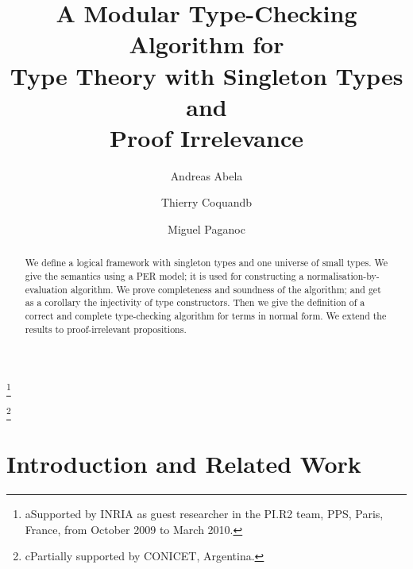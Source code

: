 \documentclass{LMCS}
\begin{document}
\title[A Modular Type-Checking Algorithm for Type Theory]{A Modular
  Type-Checking Algorithm for \\ Type Theory with Singleton Types and
  \\ Proof Irrelevance}

\author[A.~Abel]{Andreas Abel\rsuper a}	\address{{\lsuper a}Ludwig-Maximilians-Universit\"{a}t M\"{u}nchen}	\email{\abelmail}  \thanks{{\lsuper a}Supported by INRIA 
as guest researcher in the PI.R2 team, PPS,
Paris, France, from October 2009 to March 2010.}	

\author[T.~Coquand]{Thierry Coquand\rsuper b}	\address{{\lsuper b}G\"{o}teborg University}	\email{\coquandmail}  

\author[M.~Pagano]{Miguel Pagano\rsuper c} \address{{\lsuper c}Universidad Nacional de C\'{o}rdoba} \email{\paganomail} \thanks{{\lsuper c}Partially supported by CONICET, Argentina.} 











\begin{abstract}
  \noindent We define a logical framework with singleton types and one
  universe of small types. We give the semantics using a PER model; it
  is used for constructing a normalis\-ation-by-evaluation algorithm.
  We prove completeness and soundness of the algorithm; and get as a
  corollary the injectivity of type constructors. Then we give the
  definition of a correct and complete type-checking algorithm for
  terms in normal form. We extend the results to proof-irrelevant
  propositions.
\end{abstract}

\maketitle

\newtheorem{lemma}[thm]{Lemma}
\newtheorem{corollary}[thm]{Corollary}
\newtheorem{remark}[thm]{Remark}
\newtheorem{definition}[thm]{Definition}
\newtheorem{theorem}[thm]{Theorem}
\section{Introduction and Related Work}
\label{sec:intro}
\setcounter{footnote}{0} 
\end{document}
